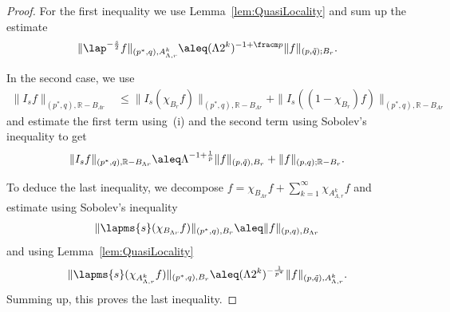 \begin{proof}
 For the first inequality we use Lemma~\ref{lem:QuasiLocality}
 and sum up the estimate
 \begin{equation*}
  \|\lap^{-\frac{s}{2}} f\|_{(p^*,  q ),A^k_{\Lambda, r}} \aleq (\Lambda 2^k)^{-1+\fracm p} \|f\|_{(p, \tilde q);B_r}.
 \end{equation*}

 In the second case, we use 
 \begin{align*}
  \|I_sf\|_{(p^\ast, q), \mathbb R - B_{\Lambda r}}
  &\leq \|I_s(\chi_{B_r}f)\|_{(p^\ast, q), \mathbb R - B_{\Lambda r}}
  + \|I_s((1-\chi_{B_r})f)\|_{(p^\ast, q), \mathbb R - B_{\Lambda r}}
 \end{align*}
 and estimate the first term using~(i)
 and the second term
 using Sobolev's inequality to get
 \begin{equation*}
  \|I_sf\|_{(p^\ast, q), \mathbb R - B_{\Lambda r}} 
  \aleq \Lambda^{-1+\frac 1 p} \|f\|_{(p,\tilde q), B_r} 
  + \|f\|_{(p,q); \mathbb R - B_{r}}.
 \end{equation*}

 To deduce the last inequality, we decompose $f= \chi_{B_{\Lambda r}} f + \sum_{k=1}^\infty \chi_{A^{k}_{\Lambda, r}} f$ 
 and estimate using Sobolev's inequality
 \begin{align*}
  \|\lapms{s}(\chi_{B_{\Lambda r}}f)\|_{(p^\ast,q),B_r} \aleq \|f\|_{(p,q),B_{\Lambda r}}
 \end{align*}
 and using Lemma~\ref{lem:QuasiLocality}
 \begin{align*}
  \|\lapms{s}(\chi_{A^{k}_{\Lambda,r}}f)\|_{(p^\ast,q), B_r} 
  \aleq (\Lambda 2^k)^{-\frac 1 {p^\ast}}\|f\|_{(p,\tilde q),A^k_{\Lambda,r}}.
 \end{align*}
 Summing up, this proves the last inequality.
\end{proof}




